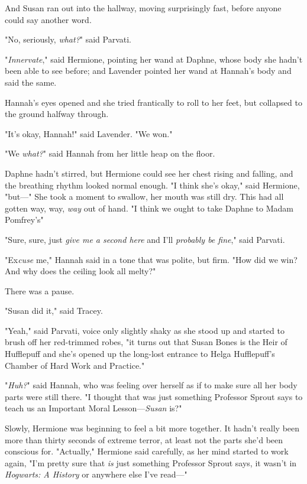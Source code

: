 And Susan ran out into the hallway, moving surprisingly fast, before anyone
could say another word.

"No, seriously, \emph{what?}" said Parvati.

"\emph{Innervate}," said Hermione, pointing her wand at Daphne, whose body she
hadn't been able to see before; and Lavender pointed her wand at Hannah's body
and said the same.

Hannah's eyes opened and she tried frantically to roll to her feet, but
collapsed to the ground halfway through.

"It's okay, Hannah!" said Lavender. "We won."

"We \emph{what?}" said Hannah from her little heap on the floor.

Daphne hadn't stirred, but Hermione could see her chest rising and falling, and
the breathing rhythm looked normal enough. "I think she's okay," said Hermione,
"but—" She took a moment to swallow, her mouth was still dry. This had all
gotten way, way, \emph{way} out of hand. "I think we ought to take Daphne to
Madam Pomfrey's{\el}"

"Sure, sure, just \emph{give me a second here} and I'll \emph{probably be
fine}," said Parvati.

"Ex\emph{cuse} me," Hannah said in a tone that was polite, but firm. "How did
we win? And why does the ceiling look all melty?"

There was a pause.

"Susan did it," said Tracey.

"Yeah," said Parvati, voice only slightly shaky as she stood up and started to
brush off her red-trimmed robes, "it turns out that Susan Bones is the Heir of
Hufflepuff and she's opened up the long-lost entrance to Helga Hufflepuff's
Chamber of Hard Work and Practice."

"\emph{Huh?}" said Hannah, who was feeling over herself as if to make sure all
her body parts were still there. "I thought that was just something Professor
Sprout says to teach us an Important Moral Lesson—\emph{Susan} is?"

Slowly, Hermione was beginning to feel a bit more together. It hadn't really
been more than thirty seconds of extreme terror, at least not the parts she'd
been conscious for. "Actually," Hermione said carefully, as her mind started to
work again, "I'm pretty sure that \emph{is} just something Professor Sprout
says, it wasn't in \emph{Hogwarts: A History} or anywhere else I've read—"

